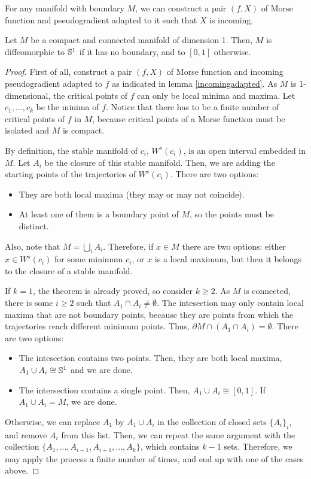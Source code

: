 \begin{lema} \label{incomingadapted}
For any manifold with boundary $M$, we can construct a pair $(f,X)$ of Morse function and pseudogradient adapted to it such that $X$ is incoming.
\end{lema}

\begin{theo} \label{1dimensional}
Let $M$ be a compact and connected manifold of dimension 1. Then, $M$ is diffeomorphic to $\mathbb{S}^1$ if it has no boundary, and to $[0,1]$ otherwise.
\end{theo}

\begin{proof}
First of all, construct a pair $(f,X)$ of Morse function and incoming pseudogradient adapted to $f$ as indicated in lemma \ref{incomingadapted}. As $M$ is 1-dimensional, the critical points of $f$ can only be local minima and maxima. Let $c_1,...,c_k$ be the minima of $f$. Notice that there has to be a finite number of critical points of $f$ in $M$, because critical points of a Morse function must be isolated and $M$ is compact.

By definition, the stable manifold of $c_i$, $W^s(c_i)$, is an open interval embedded in $M$. Let $A_i$ be the closure of this stable manifold. Then, we are adding the starting points of the trajectories of $W^s(c_i)$. There are two options:

\begin{itemize}
	\item They are both local maxima (they may or may not coincide).
	\item At least one of them is a boundary point of $M$, so the points must be distinct.
\end{itemize}

Also, note that $M = \bigcup_i A_i$. Therefore, if $x \in M$ there are two options: either $x \in W^s(c_i)$ for some minimum $c_i$, or $x$ is a local maximum, but then it belongs to the closure of a stable manifold.

If $k=1$, the theorem is already proved, so consider $k \geq 2$. As $M$ is connected, there is some $i \geq 2$ such that $A_1 \cap A_i \neq \emptyset$. The intesection may only contain local maxima that are not boundary points, because they are points from which the trajectories reach different minimum points. Thus, $\partial M \cap (A_1 \cap A_i) = \emptyset$. There are two options:

\begin{itemize}
	\item The intesection contains two points. Then, they are both local maxima, $A_1 \cup A_i \cong \mathbb{S}^1$ and we are done.
	\item The intersection contains a single point. Then, $A_1 \cup A_i \cong [0,1]$. If $A_1 \cup A_i = M$, we are done.
\end{itemize}

Otherwise, we can replace $A_1$ by $A_1 \cup A_i$ in the collection of closed sets $\{A_i\}_i$, and remove $A_i$ from this list. Then, we can repeat the same argument with the collection $\{A_1,...,A_{i-1},A_{i+1},...,A_k\}$, which contains $k-1$ sets. Therefore, we may apply the process a finite number of times, and end up with one of the cases above.
\end{proof}
